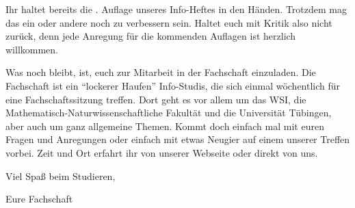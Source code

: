 Ihr haltet bereits die \number\auflage. Auflage unseres Info-Heftes in den
Händen. Trotzdem mag das ein oder andere noch zu verbessern sein. Haltet
euch mit Kritik also nicht zurück, denn jede Anregung für die kommenden
Auf\/lagen ist herzlich willkommen.

Was noch bleibt, ist, euch zur Mitarbeit in der Fachschaft einzuladen.  Die
Fachschaft ist ein "`lockerer Haufen"' Info-Studis, die sich einmal wöchentlich
für eine Fachschaftssitzung treffen. Dort geht es vor allem um das WSI, die 
Mathematisch-Naturwissenschaftliche Fakultät und die Universität Tübingen, 
aber auch um ganz allgemeine Themen. Kommt doch einfach mal mit euren Fragen 
und Anregungen oder einfach mit etwas Neugier auf einem unserer Treffen vorbei.  
Zeit und Ort erfahrt ihr von unserer Webseite oder direkt von uns.

\bigskip

Viel Spaß beim Studieren,

Eure Fachschaft
\vfill
\bigskip

\eject

